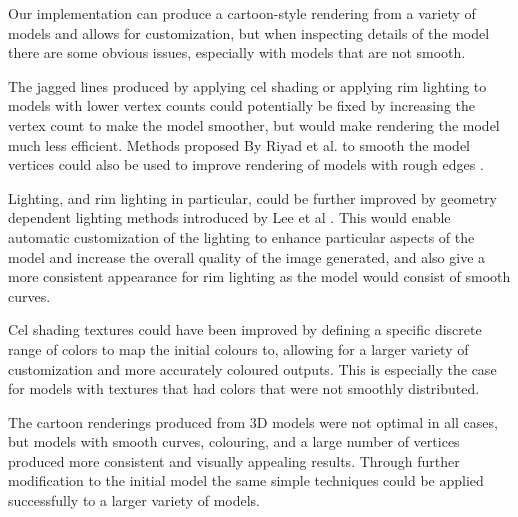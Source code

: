 Our implementation can produce a cartoon-style rendering from a variety of models and 
allows for customization, but when inspecting details of the model there are some obvious 
issues, especially with models that are not smooth.

The jagged lines produced by applying cel shading or applying rim lighting to models with 
lower vertex counts could potentially be fixed by increasing the vertex count to make the model 
smoother, but would make rendering the model much less efficient. Methods proposed By Riyad et 
al. to smooth the model vertices could also be used to improve rendering of models with rough 
edges \cite{riyad16}. 

Lighting, and rim lighting in particular, could be further improved by geometry dependent 
lighting methods introduced by Lee et al \cite{lee06}. This would enable automatic customization 
of the lighting to enhance particular aspects of the model and increase the overall quality of 
the image generated, and also give a more consistent appearance for rim lighting as the model 
would consist of smooth curves.

Cel shading textures could have been improved by defining a specific discrete range of colors 
to map the initial colours to, allowing for a larger variety of customization and more accurately 
coloured outputs. This is especially the case for models with textures that had colors that were 
not smoothly distributed.

The cartoon renderings produced from 3D models were not optimal in all cases, but models with 
smooth curves, colouring, and a large number of vertices produced more consistent and visually 
appealing results. Through further modification to the initial model the same simple techniques 
could be applied successfully to a larger variety of models.